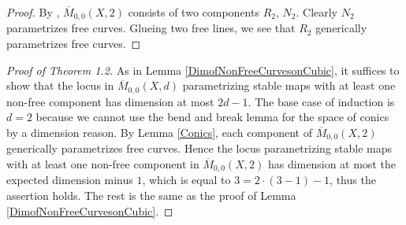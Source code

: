\documentclass[dvipdfmx, 12pt, a4paper]{amsart}
\theoremstyle{plain}
\theoremstyle{definition}
\theoremstyle{remark}
\newcommand{\ol}{\overline}
\begin{document}
		\begin{proof}
			By \cite[Proof of Proposition 7.4]{LT2019GMC}, $\ol{M}_{0,0}(X,2)$ consists of two components $R_2$, $N_2$. Clearly $N_2$ parametrizes free curves. Glueing two free lines, we see that $R_2$ generically parametrizes free curves.
		\end{proof}


	\begin{proof}[Proof of Theorem 1.2]
		As in Lemma \ref{DimofNonFreeCurvesonCubic}, it suffices to show that the locus in $\ol{M}_{0,0}(X,d)$ parametrizing stable maps with at least one non-free component has dimension at most $2d-1$.
		The base case of induction is $d=2$ because we cannot use the bend and break lemma for the space of conics by a dimension reason. By Lemma \ref{Conics}, each component of $\ol{M}_{0,0}(X,2)$ generically parametrizes free curves. Hence the locus parametrizing stable maps with at least one non-free component in $\ol{M}_{0,0}(X,2)$ has dimension at most the expected dimension minus $1$, which is equal to $3=2\cdot(3-1)-1$, thus the assertion holds. The rest is the same as the proof of Lemma \ref{DimofNonFreeCurvesonCubic}.
	\end{proof}





\end{document}
